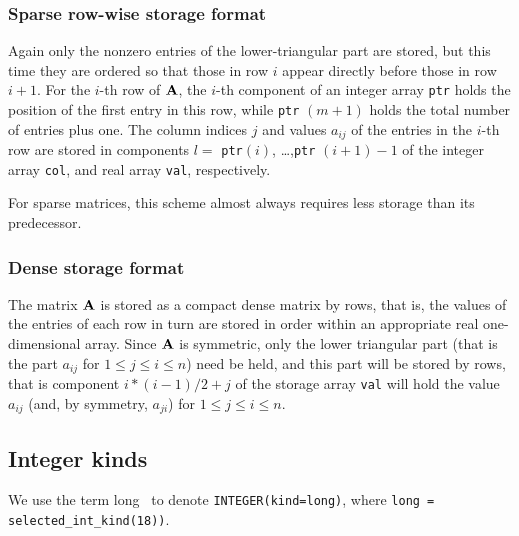 \documentclass{galahad}
\begin{document}
\subsubsection{Sparse row-wise storage format}\label{rowwise}
Again only the nonzero entries of the lower-triangular part are stored,
but this time they are ordered so that those in row $i$ appear directly
before those in row $i+1$. For the $i$-th row of ${\mathbf{A}}$, the $i$-th component
of an integer array {\tt ptr} holds the position of the first entry in this row,
while {\tt ptr} $(m+1)$ holds the total number of entries plus one.
The column indices $j$ and values $a_{ij}$ of the entries in the $i$-th row
are stored in components
$l =$ {\tt ptr}$(i)$, \ldots ,{\tt ptr} $(i+1)-1$ of the
integer array {\tt col}, and real array {\tt val}, respectively.

For sparse matrices, this scheme almost always requires less storage than
its predecessor.

\subsubsection{Dense storage format}\label{dense}
The matrix ${\mathbf{A}}$ is stored as a compact
dense matrix by rows, that is, the values of the entries of each row in turn are
stored in order within an appropriate real one-dimensional array.
Since ${\mathbf{A}}$ is symmetric, only the lower triangular part (that is the part
$a_{ij}$ for $1 \leq j \leq i \leq n$) need be held, and this part will be
stored by rows, that is component
$i \ast (i-1)/2 + j$ of the storage array {\tt val}
will hold the value $a_{ij}$ (and, by symmetry, $a_{ji}$)
for $1 \leq j \leq i \leq n$.



\subsection{Integer kinds}\label{Integer kinds}
We use the term
long \integer\ to denote {\tt INTEGER\-(kind=long)}, where
{\tt long = selected\_int\_kind(18))}.
\end{document}

